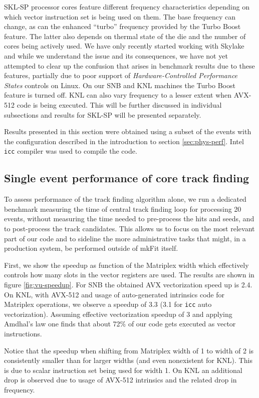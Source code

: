 \documentclass{webofc}
\def\mkfit{mkFit\xspace}
\def\stt#1{{\small\texttt{#1}}}
\begin{document}
SKL-SP processor cores feature different frequency characteristics depending on
which vector instruction set is being used on them. The base frequency can
change, as can the enhanced ``turbo'' frequency provided by the Turbo Boost
feature. The latter also depends on thermal state of the die and the number of
cores being actively used. We have only recently started working with Skylake and
while we understand the issue and its consequences, we have not yet attempted to
clear up the confusion that arises in benchmark results due to these features,
partially due to poor support of \emph{Hardware-Controlled Performance States}
controls on Linux. On our SNB and KNL machines the Turbo Boost feature is turned
off. KNL can also vary frequency to a lesser extent when AVX-512 code is being
executed. This will be further discussed in individual subsections and results
for SKL-SP will be presented separately.

Results presented in this section were obtained using a subset of the 
events with the configuration described in the introduction to section 
\ref{sec:phys-perf}. Intel \stt{icc} compiler was used to compile the
code.


\subsection{Single event performance of core track finding}

To assess performance of the track finding algorithm alone, we run a dedicated
benchmark measuring the time of central track finding loop for processing 20 
events, without measuring the time needed to pre-process the hits and seeds, 
and to post-process the track candidates. This allows us to focus on the most 
relevant part of our code and to sideline the more administrative tasks that 
might, in a production system, be performed outside of \mkfit itself.

First, we show the speedup as function of the Matriplex width which
effectively controls how many slots in the vector registers are used. The
results are shown in figure \ref{fig:vu-speedup}.
For SNB the obtained AVX vectorization speed up is 2.4. On KNL, with AVX-512
and usage of auto-generated intrinsics code for Matriplex operations, we
observe a speedup of 3.3 (3.1 for \stt{icc} auto vectorization). Assuming effective
vectorization speedup of 3 and applying Amdhal's law one finds that about 72\%
of our code gets executed as vector instructions.

Notice that the speedup when shifting from Matriplex width of 1 to width of 2
is consistently smaller than for larger widths (and even nonexistent for
KNL). This is due to scalar instruction set being used for width 1. On KNL
an additional drop is observed due to usage of AVX-512 intrinsics and the
related drop in frequency.
\end{document}
